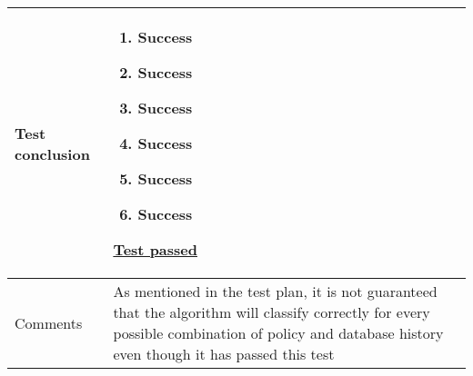 \begin{center}
\begin{longtable}{ | p{4cm} | p{10cm} | }
			Test conclusion & 	\begin{enumerate}
							\item Success
							\item Success
							\item Success
							\item Success
							\item Success
							\item Success
						\end{enumerate}
						\underline{Test passed} \\  [3pt] \hline
			Comments & As mentioned in the test plan, it is not guaranteed that the algorithm will classify correctly for every possible combination of policy and database history even though it has passed this test
					\\ [3pt] \hline
		\end{longtable}
	\end{center}

